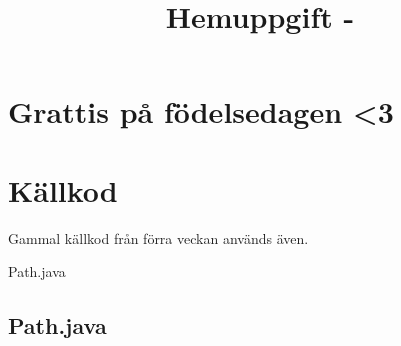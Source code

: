 \documentclass[a4paper,10pt,twoside]{article}
\title{Hemuppgift \assignmentNumber -  \courseName}
\date{\writtenDate}
\author{\myName}
\begin{document}
\maketitle %
	\thispagestyle{empty}\cfoot{}
\clearpage %
\thispagestyle{empty}\cfoot{}
\tableofcontents %
\clearpage
\setcounter{page}{1} %

\section{Grattis på födelsedagen <3} %

\appendix

\section{Källkod}

Gammal källkod från förra veckan används även.

Path.java


\subsection{Path.java}


\end{document}
